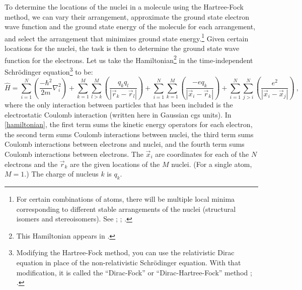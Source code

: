 \documentclass[12pt,onecolumn,secnumarabic,amsmath,amssymb,balancelastpage,nofootinbib]{article}
\begin{document}
To determine the locations of the nuclei in a molecule using the Hartree-Fock method, we can vary their arrangement, approximate the ground state electron wave function and the ground state energy of the molecule for each arrangement, and select the arrangement that minimizes ground state energy.\footnote{For certain combinations of atoms, there will be multiple local minima corresponding to different stable arrangements of the nuclei (structural isomers and stereoisomers).  See \cite{lowdin1989}; \cite[sec.\ 15.10]{levineQC}; \cite{franklinF}.}  Given certain locations for the nuclei, the task is then to determine the ground state wave function for the electrons.  Let us take the Hamiltonian\footnote{This Hamiltonian appears in \cite[pg.\ 345]{levineQC}.} in the time-independent Schr\"{o}dinger equation\footnote{Modifying the Hartree-Fock method, you can use the relativistic Dirac equation in place of the non-relativistic Schr\"{o}dinger equation.  With that modification, it is called the ``Dirac-Fock'' or ``Dirac-Hartree-Fock'' method \cite{desclaux2002}; \cite[pg.\ 581]{levineQC}.} to be:
\begin{equation}
\widehat{H}= \sum_{i=1}^{N}\left(\frac{-\hbar^2}{2 m} \nabla_i^2 \right)  + \sum_{k=1}^{M}\sum_{l>k}^{M} \left(\frac{q_k q_l}{|\vec{r}_k-\vec{r}_l|}\right) +  \sum_{i=1}^{N}\sum_{k=1}^{M}\left(\frac{-e q_k}{|\vec{x}_i-\vec{r}_k|}\right)  + \sum_{i=1}^{N}\sum_{j>i}^{N}\left(\frac{e^2}{|\vec{x}_i-\vec{x}_j|}\right)
\ ,
\label{hamiltonian}
\end{equation}
where the only interaction between particles that has been included is the electrostatic Coulomb interaction (written here in Gaussian cgs units).  In \eqref{hamiltonian}, the first term sums the kinetic energy operators for each electron, the second term sums Coulomb interactions between nuclei, the third term sums Coulomb interactions between electrons and nuclei, and the fourth term sums Coulomb interactions between electrons.  The $\vec{x}_i$ are coordinates for each of the $N$ electrons and the $\vec{r}_k$ are the given locations of the $M$ nuclei.  (For a single atom, $M=1$.)  The charge of nucleus $k$ is $q_k$.
\end{document}
